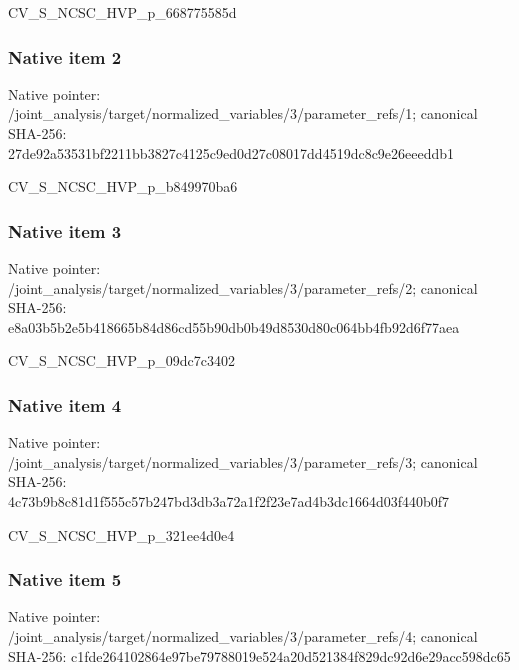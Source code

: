 \documentclass[10pt,a4paper]{article}
\begin{document}
\begingroup\raggedright\sloppy CV\_\allowbreak{}S\_\allowbreak{}NCSC\_\allowbreak{}HVP\_\allowbreak{}p\_\allowbreak{}668775585d\par\endgroup

\subsubsection{Native item 2}
Native pointer: /joint\_\allowbreak{}analysis/target/normalized\_\allowbreak{}variables/3/parameter\_\allowbreak{}refs/1; canonical SHA-256: 27de92a53531bf2211bb3827c4125c9ed0d27c08017dd4519dc8c9e26eeeddb1

\begingroup\raggedright\sloppy CV\_\allowbreak{}S\_\allowbreak{}NCSC\_\allowbreak{}HVP\_\allowbreak{}p\_\allowbreak{}b849970ba6\par\endgroup

\subsubsection{Native item 3}
Native pointer: /joint\_\allowbreak{}analysis/target/normalized\_\allowbreak{}variables/3/parameter\_\allowbreak{}refs/2; canonical SHA-256: e8a03b5b2e5b418665b84d86cd55b90db0b49d8530d80c064bb4fb92d6f77aea

\begingroup\raggedright\sloppy CV\_\allowbreak{}S\_\allowbreak{}NCSC\_\allowbreak{}HVP\_\allowbreak{}p\_\allowbreak{}09dc7c3402\par\endgroup

\subsubsection{Native item 4}
Native pointer: /joint\_\allowbreak{}analysis/target/normalized\_\allowbreak{}variables/3/parameter\_\allowbreak{}refs/3; canonical SHA-256: 4c73b9b8c81d1f555c57b247bd3db3a72a1f2f23e7ad4b3dc1664d03f440b0f7

\begingroup\raggedright\sloppy CV\_\allowbreak{}S\_\allowbreak{}NCSC\_\allowbreak{}HVP\_\allowbreak{}p\_\allowbreak{}321ee4d0e4\par\endgroup

\subsubsection{Native item 5}
Native pointer: /joint\_\allowbreak{}analysis/target/normalized\_\allowbreak{}variables/3/parameter\_\allowbreak{}refs/4; canonical SHA-256: c1fde264102864e97be79788019e524a20d521384f829dc92d6e29acc598dc65
\end{document}
